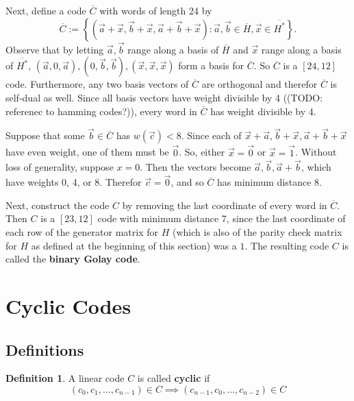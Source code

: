 \documentclass{article}
\newcommand{\ext}[1]{\overline{#1}}
\renewcommand{\=}{\equiv}
\newcommand{\set}[1]{\left\{ #1 \right\}}
\renewcommand{\v}{\vec}
\newcommand{\x}{{\v x}}
\theoremstyle{plain}
\theoremstyle{definition}
\newtheorem{defn}{Definition}[subsection]
\newcommand{\TODO}[1]{(TODO: #1)}
\begin{document}
Next, define a code $\ext{C}$ with words of length 24 by
$$ \ext{C} := \set{ (\v a + \x, \v b + \x, \v a + \v b + \x) : \v a,\v b \in \ext{H}, \x \in \ext{H^*} }. $$
Observe that by letting $\v a, \v b$ range along a basis of $\ext H$ and $\x$ range along a basis of $\ext{H^*}$, $(\v a, 0, \v a), (0, \v b, \v b), (\x, \x, \x)$ form a basis for $\ext{C}$.
So $\ext{C}$ is a $[24,12]$ code.
Furthermore, any two basis vectors of $\ext{C}$ are orthogonal and therefor $\ext{C}$ is self-dual as well.
Since all basis vectors have weight divisible by 4 (\TODO{referenec to hamming codes?}), every word in $\ext{C}$ has weight divisible by 4.

Suppose that some $\v b \in \ext{C}$ has $w(\v c) < 8$.
Since each of $\x + \v a, \v b + \x, \v a + \v b + \x$ have even weight, one of them must be $\v 0$.
So, either $\x = \v 0$ or $\x = \v 1$.
Without loss of generality, suppose $x = 0$.
Then the vectors become $\v a, \v b, \v a + \v b$, which have weights 0, 4, or 8.
Therefor $\v c = \v 0$, and so $\ext{C}$ has minimum distance 8.

Next, construct the code $C$ by removing the last coordinate of every word in $\ext{C}$.
Then $C$ is a $[23,12]$ code with minimum distance 7, since the last coordinate of each row of the generator matrix for $H$ (which is also of the parity check matrix for $H$ as defined at the beginning of this section) was a $1$.
The resulting code $C$ is called the \textbf{binary Golay code}.

\section{Cyclic Codes}

\subsection{Definitions}

\begin{defn}
  A linear code $C$ is called \textbf{cyclic} if
  $$ (c_0, c_1, \dots, c_{n-1}) \in C \implies (c_{n-1}, c_0, \dots, c_{n-2}) \in C $$
\end{defn}
\end{document}
